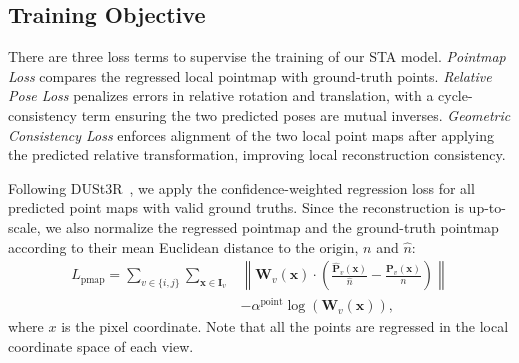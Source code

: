 \subsection{Training Objective}
\label{subsec:loss}
There are three loss terms to supervise the training of our STA model. \textit{Pointmap Loss} compares the regressed local pointmap with ground-truth points. \textit{Relative Pose Loss} penalizes errors in relative rotation and translation, with a cycle-consistency term ensuring the two predicted poses are mutual inverses. \textit{Geometric Consistency Loss} enforces alignment of the two local point maps after applying the predicted relative transformation, improving local reconstruction consistency.


Following DUSt3R~\cite{dust3r}, we apply the confidence-weighted regression loss for all predicted point maps with valid ground truths. Since the reconstruction is up-to-scale, we also normalize the regressed pointmap and the ground-truth pointmap according to their mean Euclidean distance to the origin, $n$ and $\hat{n}$:
\begin{align}
L_\text{pmap} = \sum_{v \in \{i, j\}} \sum_{\bm x \in \bm{I}_v} & \left\|\bm W_v(\bm x)\cdot \left(\frac{\hat{\bm{P}}_v(\bm x)}{\hat{n}} - \frac{\bm{P}_v(\bm x)}{n} \right)\right\|   \nonumber\\
&- \alpha^{\text{point}}\log\left(\bm W_v(\bm x)\right),
\label{eq:loss_pmap}
\end{align}
where $x$ is the pixel coordinate. Note that all the points are regressed in the local coordinate space of each view.


